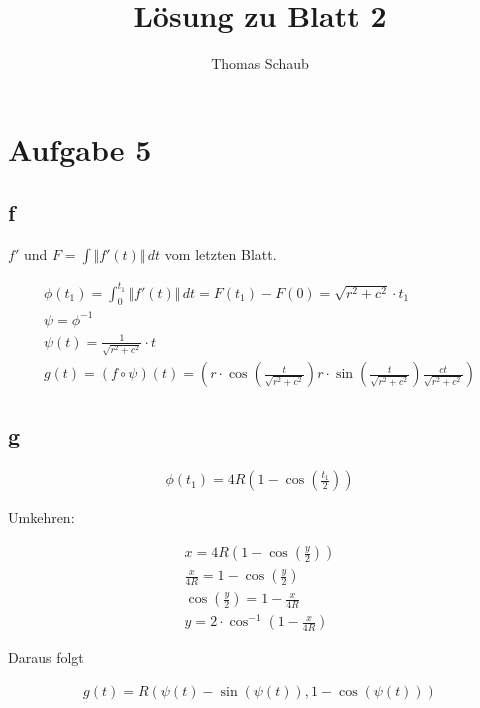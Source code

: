 \documentclass{scrartcl}
\title{Lösung zu Blatt 2}
\author{Thomas Schaub}
\begin{document}
\maketitle

\section{Aufgabe 5}

\subsection{f}

$f\prime$ und $F = \int \Vert f\prime(t) \Vert \, dt$ vom letzten Blatt.

\begin{align*}
\phi(t_1) = \int_0^{t_1}  \Vert f\prime(t) \Vert \, dt = F(t_1) - F(0)
= \sqrt{r^2 + c^2} \cdot t_1 \\
\psi = \phi^{-1} \\
\psi(t) = \frac{1}{\sqrt{r^2 + c^2}} \cdot t \\
g(t) = (f \circ \psi)(t) = (
r \cdot \cos(\frac{t}{\sqrt{r^2 + c^2}})
r \cdot \sin(\frac{t}{\sqrt{r^2 + c^2}})
\frac{ct}{\sqrt{r^2 + c^2}}
)
\end{align*}

\subsection{g}

\begin{align*}
\phi(t_1) = 4R(1-\cos(\frac{t_1}{2}))
\end{align*}

Umkehren:

\begin{align*}
x = 4R(1-\cos(\frac{y}{2})) \\
\frac{x}{4R} = 1 - \cos(\frac{y}{2}) \\
\cos(\frac{y}{2}) = 1 - \frac{x}{4R} \\
y = 2 \cdot \cos^{-1} (1 - \frac{x}{4R})
\end{align*}

Daraus folgt

\begin{align*}
g(t) = R(\psi(t) - \sin(\psi(t)), 1 - \cos(\psi(t)))
\end{align*}
\end{document}
